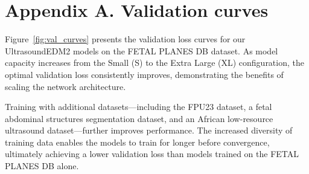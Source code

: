 \documentclass[runningheads]{llncs}
\begin{document}


%
%
%



\appendix

\section{Appendix A. Validation curves}

Figure~\ref{fig:val_curves} presents the validation loss curves for our UltrasoundEDM2 models on the FETAL PLANES DB dataset.
As model capacity increases from the Small (S) to the Extra Large (XL) configuration, the optimal validation loss consistently improves, demonstrating the benefits of scaling the network architecture.

Training with additional datasets—including the FPU23 dataset, a fetal abdominal structures segmentation dataset, and an African low-resource ultrasound dataset—further improves performance.
The increased diversity of training data enables the models to train for longer before convergence, ultimately achieving a lower validation loss than models trained on the FETAL PLANES DB alone.
\end{document}
